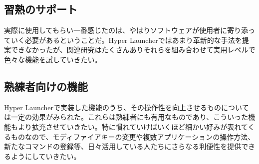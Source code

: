 \subsection{習熟のサポート}
実際に使用してもらい一番感じたのは、やはりソフトウェアが使用者に寄り添っていく必要があるということだ。Hyper Launcherではあまり革新的な手法を提案できなかったが、関連研究はたくさんありそれらを組み合わせて実用レベルで色々な機能を試していきたい。

\subsection{熟練者向けの機能}
Hyper Launcherで実装した機能のうち、その操作性を向上させるものについては一定の効果がみられた。これらは熟練者にも有用なものであり、こういった機能もより拡充させていきたい。特に慣れていけばいくほど細かい好みが表れてくるものなので、モディファイアキーの変更や複数アプリケーションの操作方法、新たなコマンドの登録等、日々活用している人たちにさらなる利便性を提供できるようにしていきたい。